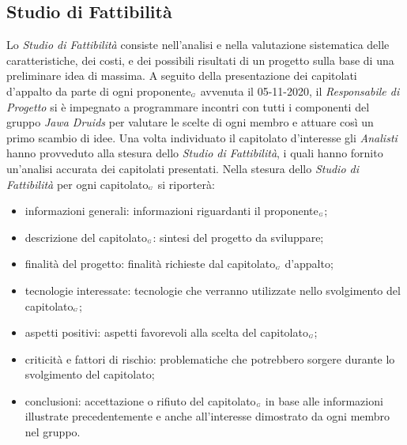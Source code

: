 \subsection{Studio di Fattibilità}\label{ProcessiPrimariFornituraStudioDiFattibilità}
Lo \textit{Studio di Fattibilità} consiste nell'analisi e nella valutazione sistematica delle caratteristiche, dei costi, e dei possibili risultati di un progetto sulla base di una preliminare idea di massima.
A seguito della presentazione dei capitolati d'appalto da parte di ogni proponente$_{\scaleto{G}{3pt}}$ avvenuta il 05-11-2020, il \textit{Responsabile di Progetto} si è impegnato a programmare incontri con tutti i componenti del gruppo \textit{Jawa Druids} per valutare le scelte di ogni membro e attuare così un primo scambio di idee. Una volta individuato il capitolato d'interesse gli \textit{Analisti} hanno provveduto alla stesura dello \textit{Studio di Fattibilità}, i quali hanno fornito un'analisi accurata dei capitolati presentati.
Nella stesura dello \textit{Studio di Fattibilità} per ogni capitolato$_{\scaleto{G}{3pt}}$ si riporterà:
\begin{itemize}
	\item informazioni generali: informazioni riguardanti il proponente$_{\scaleto{G}{3pt}}$;
	\item descrizione del capitolato$_{\scaleto{G}{3pt}}$: sintesi del progetto da sviluppare;
	\item finalità del progetto: finalità richieste dal capitolato$_{\scaleto{G}{3pt}}$ d'appalto;
	\item tecnologie interessate: tecnologie che verranno utilizzate nello svolgimento del capitolato$_{\scaleto{G}{3pt}}$;
	\item aspetti positivi: aspetti favorevoli alla scelta del capitolato$_{\scaleto{G}{3pt}}$;
	\item criticità e fattori di rischio: problematiche che potrebbero sorgere durante lo svolgimento del capitolato;
	\item conclusioni: accettazione o rifiuto del capitolato$_{\scaleto{G}{3pt}}$ in base alle informazioni illustrate precedentemente e anche all'interesse dimostrato da ogni membro nel gruppo.
\end{itemize}
